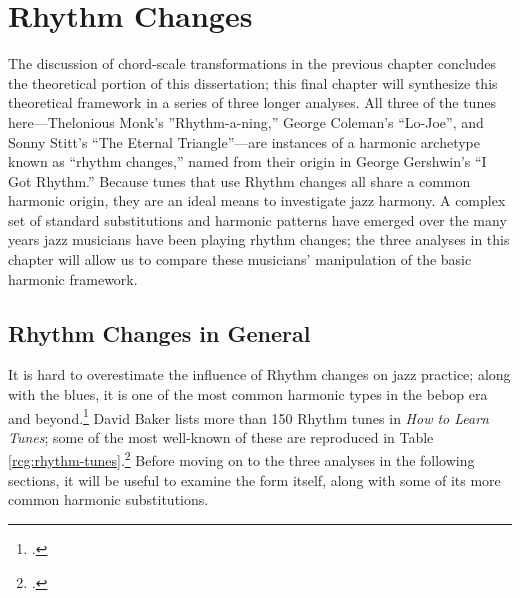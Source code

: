 
\chapter{Rhythm Changes}
\label{chap:rhythm-changes}
\addtocspace
{}

The discussion of chord-scale transformations in the previous chapter
concludes the theoretical portion of this dissertation; this final chapter
will synthesize this theoretical framework in a series of three longer
analyses. All three of the tunes here---Thelonious Monk's ''Rhythm-a-ning,''
George Coleman's ``Lo-Joe'', and Sonny Stitt's ``The Eternal Triangle''---are
instances of a harmonic archetype known as ``rhythm changes,'' named from
their origin in George Gershwin's ``I Got Rhythm.'' Because tunes
that use Rhythm changes all share a common harmonic origin, they are an ideal
means to investigate jazz harmony. A complex set of standard substitutions and
harmonic patterns have emerged over the many years jazz musicians have been
playing rhythm changes; the three analyses in this chapter will allow us to
compare these musicians' manipulation of the basic harmonic framework.

\section{Rhythm Changes in General}
\label{sec:rhythm-changes-general}

It is hard to overestimate the influence of Rhythm changes on jazz practice;
along with the blues, it is one of the most common harmonic types in the bebop
era and beyond.\footcite[13]{owens:1995} David Baker lists more than 150
Rhythm tunes in \emph{How to Learn Tunes}; some of the most well-known
of these are reproduced in Table
\ref{rcg:rhythm-tunes}.\footcite[42--44]{baker:tunes} Before moving on to the
three analyses in the following sections, it will be useful to examine the
form itself, along with some of its more common harmonic substitutions.

